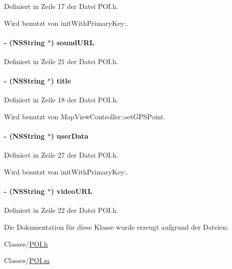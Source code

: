 Definiert in Zeile 17 der Datei POI.h.

Wird benutzt von initWithPrimaryKey:.\hypertarget{interface_p_o_i_aac5100d218d6107bdb9b0a355289c55c}{
\paragraph[{soundURL}]{\setlength{\rightskip}{0pt plus 5cm}-\/ (NSString $\ast$) soundURL}\hfill}
\label{interface_p_o_i_aac5100d218d6107bdb9b0a355289c55c}


Definiert in Zeile 21 der Datei POI.h.\hypertarget{interface_p_o_i_ae9808e7121230ffff42a799a6dec00e8}{
\paragraph[{title}]{\setlength{\rightskip}{0pt plus 5cm}-\/ (NSString $\ast$) title}\hfill}
\label{interface_p_o_i_ae9808e7121230ffff42a799a6dec00e8}


Definiert in Zeile 18 der Datei POI.h.

Wird benutzt von MapViewController::setGPSPoint.\hypertarget{interface_p_o_i_adccc1e600d247ec2e4a8a5bb241ed719}{
\paragraph[{userData}]{\setlength{\rightskip}{0pt plus 5cm}-\/ (NSString $\ast$) userData}\hfill}
\label{interface_p_o_i_adccc1e600d247ec2e4a8a5bb241ed719}


Definiert in Zeile 27 der Datei POI.h.

Wird benutzt von initWithPrimaryKey:.\hypertarget{interface_p_o_i_a0ee15b163f9aea00a479cfc65cc34091}{
\paragraph[{videoURL}]{\setlength{\rightskip}{0pt plus 5cm}-\/ (NSString $\ast$) videoURL}\hfill}
\label{interface_p_o_i_a0ee15b163f9aea00a479cfc65cc34091}


Definiert in Zeile 22 der Datei POI.h.

Die Dokumentation für diese Klasse wurde erzeugt aufgrund der Dateien:\begin{DoxyCompactItemize}
\item 
Classes/\hyperlink{_p_o_i_8h}{POI.h}\item 
Classes/\hyperlink{_p_o_i_8m}{POI.m}\end{DoxyCompactItemize}
